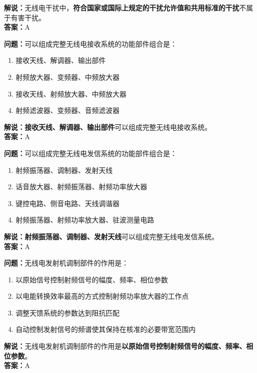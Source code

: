 \textbf{解说：}无线电干扰中，\textbf{符合国家或国际上规定的干扰允许值和共用标准的干扰}不属于有害干扰。\\\textbf{答案：}A%



\textbf{问题：}可以组成完整无线电接收系统的功能部件组合是：

\begin{enumerate}[label=\Alph*), leftmargin=1.5cm]
	\item 接收天线、解调器、输出部件
	\item 射频放大器、变频器、中频放大器
	\item 接收天线、射频放大器、中频放大器
	\item 射频滤波器、变频器、音频滤波器
\end{enumerate}

\textbf{解说：}\textbf{接收天线、解调器、输出部件}可以组成完整无线电接收系统。\\\textbf{答案：}A%



\textbf{问题：}可以组成完整无线电发信系统的功能部件组合是：

\begin{enumerate}[label=\Alph*), leftmargin=1.5cm]
	\item 射频振荡器、调制器、发射天线
	\item 话音放大器、射频振荡器、射频功率放大器
	\item 键控电路、侧音电路、天线调谐器
	\item 射频振荡器、射频功率放大器、驻波测量电路
\end{enumerate}

\textbf{解说：}\textbf{射频振荡器、调制器、发射天线}可以组成完整无线电发信系统。\\\textbf{答案：}A%



\textbf{问题：}无线电发射机调制部件的作用是：

\begin{enumerate}[label=\Alph*), leftmargin=1.5cm]
	\item 以原始信号控制射频信号的幅度、频率、相位参数
	\item 以电能转换效率最高的方式控制射频功率放大器的工作点
	\item 调整天馈系统的参数达到阻抗匹配
	\item 自动控制发射信号的频谱使其保持在核准的必要带宽范围内
\end{enumerate}

\textbf{解说：}无线电发射机调制部件的作用是\textbf{以原始信号控制射频信号的幅度、频率、相位参数}。\\\textbf{答案：}A%




